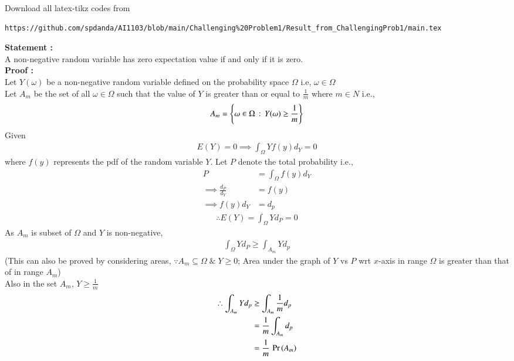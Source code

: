 \documentclass[journal,12pt,twocolumn]{IEEEtran}
\begin{document}
\author{Name: Sai Pravallika Danda, Roll Number: CS20BTECH11013}
\maketitle
\newpage
\bigskip
\renewcommand{\thefigure}{\theenumi}
\renewcommand{\thetable}{\theenumi}
Download all latex-tikz codes from 
%
\begin{lstlisting}
https://github.com/spdanda/AI1103/blob/main/Challenging%20Problem1/Result_from_ChallengingProb1/main.tex
\end{lstlisting}
\large\textbf{Statement :}\\
A non-negative random variable has zero expectation value if and only if it is zero.\\
\textbf{Proof :}\\
Let $Y(\omega)$ be a non-negative random variable defined on the probability space $\Omega$ i.e, $\omega\in\Omega$\\
Let $A_m$ be the set of all $\omega \in \Omega$ such that the value of $Y$ is greater than or equal to $\frac{1}{m}$ where $m \in N$ i.e.,
$$A_m = \left\{\omega \in \Omega\,:\,Y(\omega) \geq \frac{1}{m}\right\}$$
Given
\begin{align}
    E(Y) =0 \implies \int_\Omega Y f(y)d_Y =0
\end{align}
where $f(y)$ represents the pdf of the random variable $Y$.
Let $P$ denote the total probability i.e.,
\begin{align}
    P &= \int_\Omega f(y)d_Y\\
    \implies \frac{d_P}{d_Y} &= f(y)\\
    \implies   f(y)d_Y &= d_p 
\end{align}
\begin{align}
\therefore E(Y) = \int_\Omega Yd_P = 0
\end{align}
As $A_m$ is subset of $\Omega$ and $Y$ is non-negative,
\begin{align}
    \int_\Omega Yd_P \geq \int_{A_m}Yd_p \label{simul1}
\end{align}
(This can also be proved by considering areas, $\because A_m \subseteq \Omega\;\&\;Y\geq 0$; Area under the graph of $Y$ vs $P$ wrt $x$-axis in range $\Omega$ is greater than that of in range $A_m$)\\
Also in the set $A_m$, $Y \geq \frac{1}{m}$
\begin{align}
  \therefore \int_{A_m}Yd_p  &\geq  \int_{A_m}\frac{1}{m}d_p\\
                             &= \frac{1}{m}\int_{A_m}d_p\\
                             &= \frac{1}{m}\,\Pr\left(A_m\right) \label{simul2}
\end{align}
\end{document}
